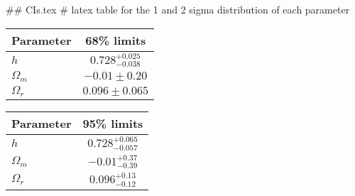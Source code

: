 ## CIs.tex
# latex table for the 1 and 2 sigma distribution of each parameter

\begin{tabular} { l  c}
 Parameter &  68\% limits\\
\hline
{\boldmath$h              $} & $0.728^{+0.025}_{-0.038}   $\\
{\boldmath$\Omega_m       $} & $-0.01\pm 0.20             $\\
{\boldmath$\Omega_r       $} & $0.096\pm 0.065            $\\
\hline
\end{tabular}

\begin{tabular} { l  c}
 Parameter &  95\% limits\\
\hline
{\boldmath$h              $} & $0.728^{+0.065}_{-0.057}   $\\
{\boldmath$\Omega_m       $} & $-0.01^{+0.37}_{-0.39}     $\\
{\boldmath$\Omega_r       $} & $0.096^{+0.13}_{-0.12}     $\\
\hline
\end{tabular}
